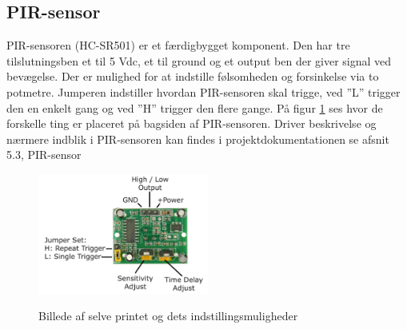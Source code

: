\subsection{PIR-sensor}

PIR-sensoren (HC-SR501) er et færdigbygget komponent. Den har tre tilslutningsben et til 5 Vdc, et til ground og et output ben der giver signal ved bevægelse. Der er mulighed for at indstille følsomheden og forsinkelse via to potmetre. Jumperen indstiller hvordan PIR-sensoren skal trigge, ved ''L'' trigger den en enkelt gang og ved ''H'' trigger den flere gange. På figur \ref{lab:pir_overview} ses hvor de forskelle ting er placeret på bagsiden af PIR-sensoren. Driver beskrivelse og nærmere indblik i PIR-sensoren kan findes i projektdokumentationen se afsnit 5.3, PIR-sensor

\begin{figure}[H] \centering
{\includegraphics[width=0.5\textwidth]{Billeder/pir_overview}}
\caption{Billede af selve printet og dets indstillingsmuligheder}
\label{lab:pir_overview}
\raggedright
\end{figure}



